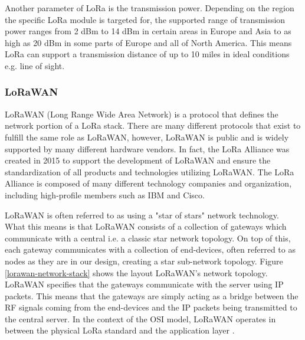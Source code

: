 Another parameter of LoRa is the transmission power. Depending on the region the specific LoRa module is targeted for, the supported range of transmission power ranges from 2 dBm to 14 dBm in certain areas in Europe and Asia to as high as 20 dBm in some parts of Europe and all of North America. This means LoRa can support a transmission distance of up to 10 miles in ideal conditions e.g. line of sight.

\subsubsection{LoRaWAN}
LoRaWAN (Long Range Wide Area Network) is a protocol that defines the network portion of a LoRa stack. There are many different protocols that exist to fulfill the same role as LoRaWAN, however, LoRaWAN is public and is widely supported by many different hardware vendors. In fact, the LoRa Alliance was created in 2015 to support the development of LoRaWAN and ensure the standardization of all products and technologies utilizing LoRaWAN. The LoRa Alliance is composed of many different technology companies and organization, including high-profile members such as IBM and Cisco.

LoRaWAN is often referred to as using a "star of stars" network technology. What this means is that LoRaWAN consists of a collection of gateways which communicate with a central i.e. a classic star network topology. On top of this, each gateway communicates with a collection of end-devices, often referred to as nodes as they are in our design, creating a star sub-network topology. Figure \ref{lorawan-network-stack} shows the layout LoRaWAN's network topology. LoRaWAN specifies that the gateways communicate with the server using IP packets. This means that the gateways are simply acting as a bridge between the RF signals coming from the end-devices and the IP packets being transmitted to the central server. In the context of the OSI model, LoRaWAN operates in between the physical LoRa standard and the application layer \cite{lora-alliance}.

